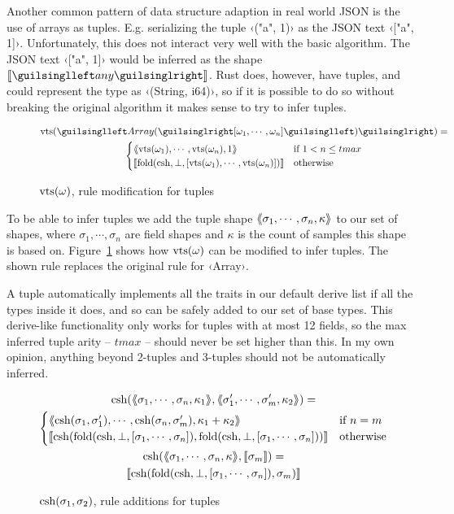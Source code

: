 Another common pattern of data structure adaption in real world JSON is the use of arrays as tuples. E.g. serializing the tuple ‹("a", 1)› as the JSON text ‹["a", 1]›. Unfortunately, this does not interact very well with the basic algorithm. The JSON text ‹["a", 1]› would be inferred as the shape $\vect{‹any›}$. Rust does, however, have tuples, and could represent the type as ‹(String, i64)›, so if it is possible to do so without breaking the original algorithm it makes sense to try to infer tuples.

\begin{figure}[ht!]
\begin{gather*}
\shap(‹Array(›[\omega_1, \cdots, \omega_n]‹)›) = \\ \begin{cases}
  \tupl{ \shap(\omega_1), \cdots, \shap(\omega_n), 1 }   &  \text{if } 1 < n \leq tmax \\
  \vect{ \fold(\csh, \bot, [\shap(\omega_1), \cdots, \shap(\omega_n)]) } & \text{otherwise}
\end{cases}
\end{gather*}
\caption{$\operatorname{vts}(\omega)$, rule modification for tuples}
\label{fig:shap-tuple}
\end{figure}

To be able to infer tuples we add the tuple shape $\langle\kern-0.25em\langle  \sigma_1, \cdots, \sigma_n, \kappa  \rangle\kern-0.25em\rangle$ to our set of shapes, where $ \sigma_1, \cdots, \sigma_n $ are field shapes and $\kappa$ is the count of samples this shape is based on. Figure~\ref{fig:shap-tuple} shows how $\operatorname{vts}(\omega)$ can be modified to infer tuples. The shown rule replaces the original rule for ‹Array›.

A tuple automatically implements all the traits in our default derive list if all the types inside it does\cite[primitive std::tuple]{rust-std-docs}, and so can be safely added to our set of base types. This derive-like functionality only works for tuples with at most 12 fields, so the max inferred tuple arity -- $tmax$ -- should never be set higher than this. In my own opinion, anything beyond 2-tuples and 3-tuples should not be automatically inferred.

\begin{figure}[ht!]
\begin{gather*}
\operatorname{csh}(\langle\kern-0.25em\langle  \sigma_1, \cdots, \sigma_n, \kappa_1  \rangle\kern-0.25em\rangle, \langle\kern-0.25em\langle  \sigma'_1, \cdots, \sigma'_m, \kappa_2  \rangle\kern-0.25em\rangle) = \\
\begin{cases}
  \langle\kern-0.25em\langle  \operatorname{csh}(\sigma_1, \sigma'_1), \cdots, \operatorname{csh}(\sigma_n, \sigma'_m), \kappa_1 + \kappa_2  \rangle\kern-0.25em\rangle   &  \text{if } n = m \\
  \llbracket  \operatorname{csh}(\operatorname{fold}(\operatorname{csh}, \bot, [\sigma_1, \cdots, \sigma_n]), \operatorname{fold}(\operatorname{csh}, \bot, [\sigma_1, \cdots, \sigma_n]))  \rrbracket & \text{otherwise}
\end{cases} \\
\operatorname{csh}(\langle\kern-0.25em\langle  \sigma_1, \cdots, \sigma_n, \kappa  \rangle\kern-0.25em\rangle, \llbracket \sigma_m \rrbracket) = \\
\llbracket \operatorname{csh}(\operatorname{fold}(\operatorname{csh}, \bot, [\sigma_1, \cdots, \sigma_n]), \sigma_m) \rrbracket
\end{gather*}
\caption{$\operatorname{csh}(\sigma_1, \sigma_2)$, rule additions for tuples}
\label{fig:csh-tuple}
\end{figure}

